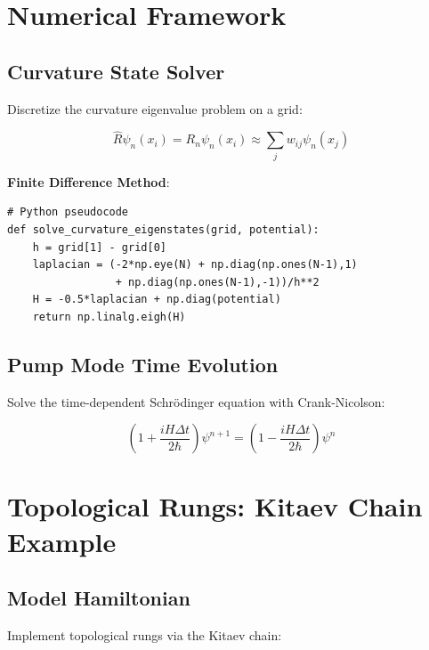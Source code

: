 \documentclass[12pt]{article}
\theoremstyle{plain}
\begin{document}
\section{Numerical Framework}

\subsection{Curvature State Solver}
Discretize the curvature eigenvalue problem on a grid:

\begin{equation}
    \hat{R}\psi_n(x_i) = R_n\psi_n(x_i) \approx \sum_j w_{ij} \psi_n(x_j)
\end{equation}

\textbf{Finite Difference Method}:
\begin{verbatim}
# Python pseudocode
def solve_curvature_eigenstates(grid, potential):
    h = grid[1] - grid[0]
    laplacian = (-2*np.eye(N) + np.diag(np.ones(N-1),1) 
                 + np.diag(np.ones(N-1),-1))/h**2
    H = -0.5*laplacian + np.diag(potential)
    return np.linalg.eigh(H)
\end{verbatim}

\subsection{Pump Mode Time Evolution}
Solve the time-dependent Schrödinger equation with Crank-Nicolson:

\begin{equation}
    (1 + \frac{iH\Delta t}{2\hbar})\psi^{n+1} = (1 - \frac{iH\Delta t}{2\hbar})\psi^n
\end{equation}


\section{Topological Rungs: Kitaev Chain Example}

\subsection{Model Hamiltonian}
Implement topological rungs via the Kitaev chain:
\end{document}
